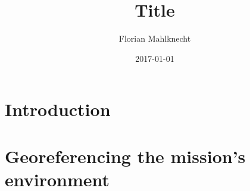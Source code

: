 \documentclass[a4paper,12pt, openright, twoside]{report}
\title{Title}
\author{Florian Mahlknecht}
\date{2017-01-01}
\providecommand{\keywords}[1]{\textbf{\textit{Keywords: }} #1}
\begin{document}
\hypersetup{pageanchor=false}
\maketitle


\thispagestyle{empty}
\setcounter{page}{2}
\cleardoublepage


\begin{abstract}
\thispagestyle{plain}
\setcounter{page}{3}
\lipsum[43]
\end{abstract}

\thispagestyle{empty}
\setcounter{page}{4}
\cleardoublepage

\begin{abstract}
\thispagestyle{plain}
\setcounter{page}{5}
\lipsum[44]
\end{abstract}



\thispagestyle{empty}
\cleardoublepage

\hypersetup{pageanchor=true}
\pagestyle{plain}


\tableofcontents

\cleardoublepage
\pagestyle{fancy}
\renewcommand{\thechapter}{\Roman{chapter}}
\renewcommand*\thesection{\arabic{section}}

\chapter{Introduction} %
\label{cha:introduction}





\chapter{Georeferencing the mission's environment} %
\label{cha:georeferencing_the_mission_s_environment}





\newpage
\clearpage


\pagestyle{plain}





\listoffigures
\listoftables
\end{document}
